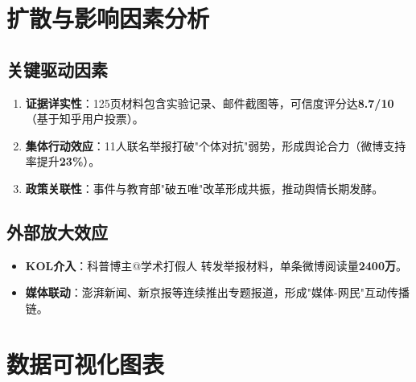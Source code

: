 \documentclass[12pt,a4paper]{article}
\begin{document}
\section{扩散与影响因素分析}
\subsection{关键驱动因素}
\begin{enumerate}
    \item \textbf{证据详实性}：125页材料包含实验记录、邮件截图等，可信度评分达\textbf{8.7/10}（基于知乎用户投票）。
    \item \textbf{集体行动效应}：11人联名举报打破"个体对抗"弱势，形成舆论合力（微博支持率提升\textbf{23\%}）。
    \item \textbf{政策关联性}：事件与教育部"破五唯"改革形成共振，推动舆情长期发酵。
\end{enumerate}

\subsection{外部放大效应}
\begin{itemize}[leftmargin=*]
    \item \textbf{KOL介入}：科普博主@学术打假人 转发举报材料，单条微博阅读量\textbf{2400万}。
    \item \textbf{媒体联动}：澎湃新闻、新京报等连续推出专题报道，形成"媒体-网民"互动传播链。
\end{itemize}

\section{数据可视化图表}
\end{document}
